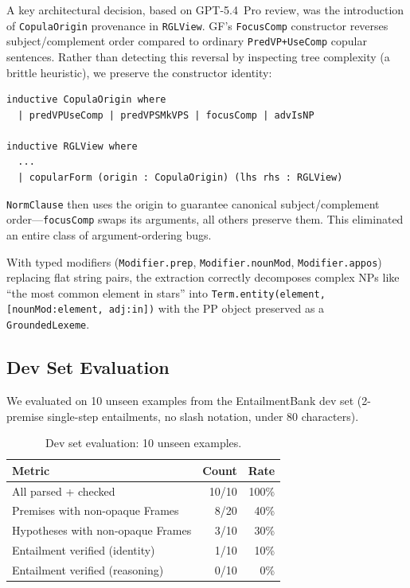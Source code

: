\documentclass[]{article}
\newcommand{\code}[1]{\texttt{#1}}
\begin{document}
A key architectural decision, based on GPT-5.4~Pro review, was the
introduction of \code{CopulaOrigin} provenance in \code{RGLView}.
GF's \code{FocusComp} constructor reverses subject/complement order
compared to ordinary \code{PredVP+UseComp} copular sentences.
Rather than detecting this reversal by inspecting tree complexity
(a brittle heuristic), we preserve the constructor identity:

\begin{lstlisting}[language={}]
inductive CopulaOrigin where
  | predVPUseComp | predVPSMkVPS | focusComp | advIsNP

inductive RGLView where
  ...
  | copularForm (origin : CopulaOrigin) (lhs rhs : RGLView)
\end{lstlisting}

\code{NormClause} then uses the origin to guarantee canonical
subject/complement order---\code{focusComp} swaps its arguments,
all others preserve them. This eliminated an entire class of
argument-ordering bugs.

With typed modifiers (\code{Modifier.prep}, \code{Modifier.nounMod},
\code{Modifier.appos}) replacing flat string pairs, the extraction
correctly decomposes complex NPs like ``the most common element in stars''
into \code{Term.entity(element, [nounMod:element, adj:in])} with the
PP object preserved as a \code{GroundedLexeme}.

\subsection{Dev Set Evaluation}

We evaluated on 10 unseen examples from the EntailmentBank dev set
(2-premise single-step entailments, no slash notation, under 80 characters).

\begin{table}[h]
\centering
\begin{tabular}{lrr}
\toprule
\textbf{Metric} & \textbf{Count} & \textbf{Rate} \\
\midrule
All parsed + checked & 10/10 & 100\% \\
Premises with non-opaque Frames & 8/20 & 40\% \\
Hypotheses with non-opaque Frames & 3/10 & 30\% \\
Entailment verified (identity) & 1/10 & 10\% \\
Entailment verified (reasoning) & 0/10 & 0\% \\
\bottomrule
\end{tabular}
\caption{Dev set evaluation: 10 unseen examples.}
\label{tab:deveval}
\end{table}
\end{document}
